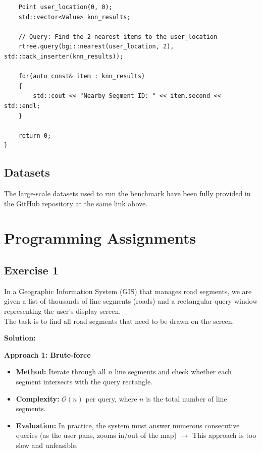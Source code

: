 \documentclass[a4paper, 10pt, titlepage]{report}
\begin{document}
\begin{verbatim}
    Point user_location(0, 0);
    std::vector<Value> knn_results;

    // Query: Find the 2 nearest items to the user_location
    rtree.query(bgi::nearest(user_location, 2), std::back_inserter(knn_results));

    for(auto const& item : knn_results)
    {
        std::cout << "Nearby Segment ID: " << item.second << std::endl;
    }

    return 0;
}
\end{verbatim}

\section{Datasets}

The large-scale datasets used to run the benchmark have been fully provided in the GitHub repository at the same link above.

\chapter{Programming Assignments}

\section{Exercise 1}
In a Geographic Information System (GIS) that manages road segments, we are given a list of thousands of line segments (roads) and a rectangular query window representing the user’s display screen. \\
The task is to find all road segments that need to be drawn on the screen.

\textbf{Solution:}

\textbf{Approach 1: Brute-force}
\begin{itemize}
    \item \textbf{Method:} Iterate through all $n$ line segments and check whether each segment intersects with the query rectangle.
    \item \textbf{Complexity:} $\mathcal{O}(n)$ per query, where $n$ is the total number of line segments.
    \item \textbf{Evaluation:} In practice, the system must answer numerous consecutive queries (as the user pans, zooms in/out of the map) $\rightarrow$ This approach is too slow and unfeasible.
\end{itemize}
\end{document}
